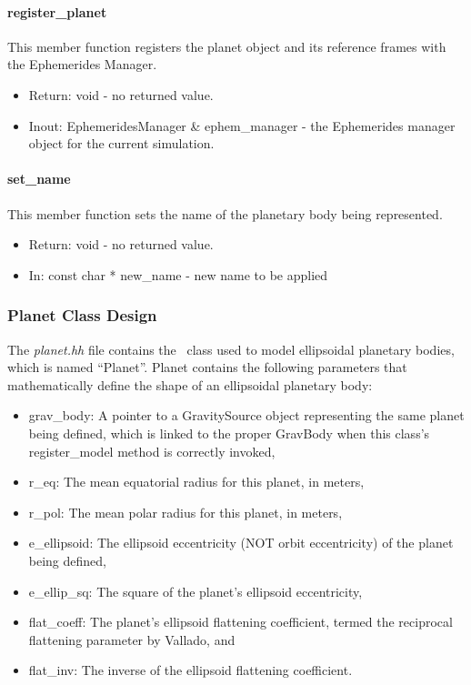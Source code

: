 \paragraph{register\_planet}

This member function registers the planet object and its reference frames
with the Ephemerides Manager.

\begin{itemize}
\item{Return:} void - no returned value.
\item{Inout:} EphemeridesManager \& ephem\_manager - the Ephemerides manager
object for the current simulation.
\end{itemize}

\paragraph{set\_name}

This member function sets the name of the planetary body being represented.

\begin{itemize}
\item{Return:} void - no returned value.
\item{In:} const char * new\_name - new name to be applied
\end{itemize}


\subsubsection{Planet Class Design}

The {\em planet.hh} file contains the \planetDesc\ class used to model
ellipsoidal planetary bodies, which is named ``Planet''.  Planet contains the
following parameters that mathematically define the shape of an ellipsoidal
planetary body:

\begin{itemize}
\item{grav\_body:} A pointer to a GravitySource object representing the same
planet being defined, which is linked to the proper GravBody when this class's
register\_model method is correctly invoked,

\item{r\_eq:} The mean equatorial radius for this planet, in meters,

\item{r\_pol:} The mean polar radius for this planet, in meters,

\item{e\_ellipsoid:} The ellipsoid eccentricity (NOT orbit eccentricity) of
the planet being defined,

\item{e\_ellip\_sq:} The square of the planet's ellipsoid eccentricity,

\item{flat\_coeff:} The planet's ellipsoid flattening coefficient, termed the
reciprocal flattening parameter by Vallado, and

\item{flat\_inv:} The inverse of the ellipsoid flattening coefficient.
\end{itemize}

